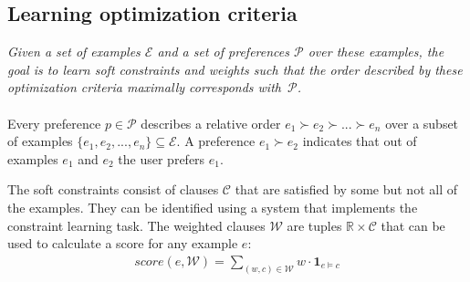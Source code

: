 \documentclass[letterpaper]{article}
\newcommand{\sym}[1]{\ensuremath{\mathcal{#1}}}
\theoremstyle{definition}
\newtheorem{example}{Example}
\begin{document}


\subsection{Learning optimization criteria}
\emph{Given a set of examples \sym{E} and a set of preferences \sym{P} over these examples, the goal is to learn soft constraints and weights such that the order described by these optimization criteria maximally corresponds with~\sym{P}.}
\\\\
Every preference $p \in \sym{P}$ describes a relative order $e_1 \succ e_2 \succ ... \succ e_n$ over a subset of examples $\{e_1, e_2, ..., e_n\} \subseteq \sym{E}$.
A preference $e_1 \succ e_2$ indicates that out of examples $e_1$ and $e_2$ the user prefers $e_1$.

The soft constraints consist of clauses \sym{C} that are satisfied by some but not all of the examples.
They can be identified using a system that implements the constraint learning task.
The weighted clauses \sym{W} are tuples $\mathbb{R} \times \sym{C}$ that can be used to calculate a score for any example $e$:
\begin{eqnarray}
  \label{eqn:score}
  score(e, \sym{W}) = \sum\limits_{(\mathit{w}, \mathit{c}) \in \sym{W}} \mathit{w} \cdot \mathbf{1}_{e \models c}
\end{eqnarray}
\end{document}
